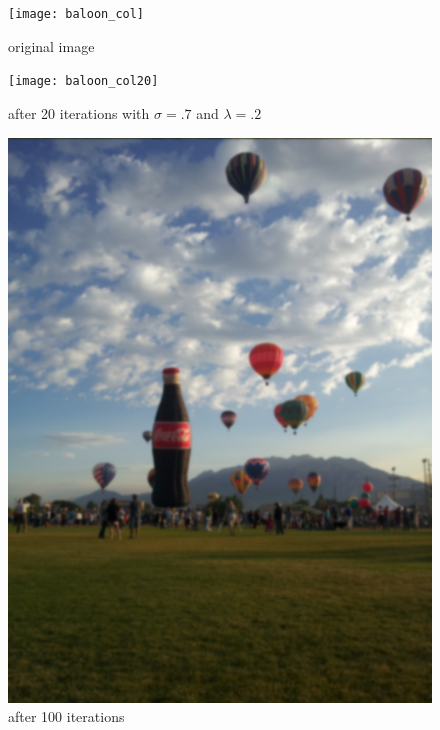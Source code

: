 \newpage
\vfill
\begin{figure}[ht]
\begin{minipage}[b]{0.45\linewidth}
\centering
\texttt{[image: baloon\_col]}
\caption*{original image}
\end{minipage}
\hspace{0.5cm}
\begin{minipage}[b]{0.45\linewidth}
\centering
\texttt{[image: baloon\_col20]}
\caption*{after 20 iterations with $\sigma = .7$ and $\lambda = .2$}
\end{minipage}
\begin{minipage}[b]{0.45\linewidth}
\centering
\includegraphics[width=\textwidth]{baloon_col100}
\caption*{after 100 iterations}
\end{minipage}
\hspace{0.5cm}
\begin{minipage}[b]{0.45\linewidth}
\centering

\end{minipage}
\end{figure}
